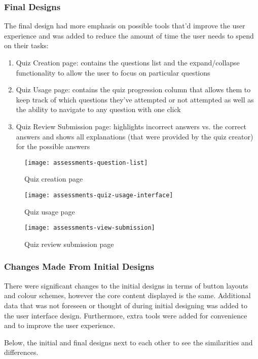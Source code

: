 \subsubsection{Final Designs}
The final design had more emphasis on possible tools that'd improve the user experience and was added to reduce the amount of time the user needs to spend on their tasks: 

\begin{enumerate}
	\item Quiz Creation page: contains the questions list and the expand/collapse functionality to allow the user to focus on particular questions
	\item Quiz Usage page: contains the quiz progression column that allows them to keep track of which questions they've attempted or not attempted as well as the ability to navigate to any question with one click
	\item Quiz Review Submission page: highlights incorrect answers vs. the correct answers and shows all explanations (that were provided by the quiz creator) for the possible answers
\end{enumerate}

\begin{figure}[h!]
	\centering
	\texttt{[image: assessments-question-list]}
	\caption{Quiz creation page}
\end{figure}

\begin{figure}[h!]
	\centering
	\texttt{[image: assessments-quiz-usage-interface]}
	\caption{Quiz usage page}
\end{figure}

\begin{figure}[h!]
	\centering
	\texttt{[image: assessments-view-submission]}
	\caption{Quiz review submission page}
\end{figure}


\subsubsection{Changes Made From Initial Designs}
There were significant changes to the initial designs in terms of button layouts and colour schemes, however the core content displayed is the same. Additional data that was not foreseen or thought of during initial designing was added to the user interface design. Furthermore, extra tools were added for convenience and to improve the user experience. 

Below, the initial and final designs next to each other to see the similarities and differences.

